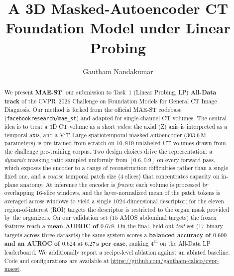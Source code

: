 \documentclass[runningheads]{llncs}
\begin{document}
\title{A 3D Masked-Autoencoder CT Foundation Model under Linear Probing}

\author{Gautham Nandakumar}

\maketitle

\begin{abstract}
We present \textbf{MAE-ST}, our submission to Task~1 (Linear Probing, LP)
\textbf{All-Data track} of the CVPR~2026 Challenge on Foundation Models for
General CT Image Diagnosis. Our method is forked from the official MAE-ST
codebase (\texttt{facebookresearch/mae\_st}) and adapted for single-channel CT
volumes. The central idea is to treat a 3D CT volume as a
short \emph{video}: the axial (Z) axis is interpreted as a temporal axis, and a
ViT-Large spatiotemporal masked autoencoder ($303.6$\,M parameters) is
pre-trained from scratch on $10{,}819$ unlabeled CT volumes drawn from the
challenge pre-training corpus. Two design choices drive the representation: a
\emph{dynamic} masking ratio sampled uniformly from $[0.6, 0.9]$ on every
forward pass, which exposes the encoder to a range of reconstruction
difficulties rather than a single fixed one, and a coarse
temporal patch size ($4$ slices) that concentrates capacity on in-plane
anatomy. At inference the encoder is \emph{frozen}: each volume is processed by
overlapping $16$-slice windows, and the layer-normalized mean of the patch
tokens is averaged across windows to yield a single $1024$-dimensional
descriptor; for the eleven region-of-interest (ROI) targets the descriptor is
restricted to the organ mask provided by the organizers. On our validation set
($15$ AMOS abdominal targets) the frozen features reach a \textbf{mean AUROC of
$0.678$}. On the final, held-out \emph{test} set
($17$ binary targets across three datasets) the same system scores a
\textbf{balanced accuracy of $0.600$ and an AUROC of $0.624$} at
\textbf{$6.27$\,s per case}, ranking $4^{\text{th}}$ on the
All-Data LP leaderboard. We additionally report a recipe-level ablation against
an ablated baseline. Code and configurations are available at
\url{https://github.com/gautham-calico/cvpr-maest}. \\[4pt]
\end{abstract}
\end{document}
